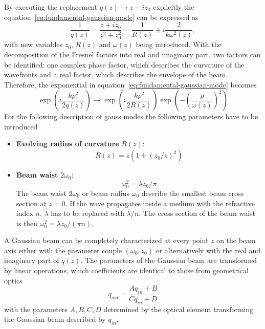 By executing the replacement $q(z)\rightarrow z-iz_0$ explicitly the equation~\eqref{eq:fundamental-gaussian-mode} can be expressed as 
\begin{equation}
\frac{1}{q(z)}=\frac{z+iz_0}{z^2+z_0^2}=\frac{1}{R(z)}+i\frac{2}{k\omega^2(z)},
\end{equation}
with new variables $z_0$, $R(z)$ and $\omega(z)$ being introduced.
With the decomposition of the Fresnel factors into real and imaginary part, two factors can be identified: one complex phase factor, which describes the curvature of the wavefronts and a real factor, which describes the envelope of the beam.
Therefore, the exponential in equation~\eqref{eq:fundamental-gaussian-mode} becomes
\begin{equation}
\exp\left(i\frac{k\rho^2}{2q(z)}\right) \rightarrow \exp\left(i\frac{k\rho^2}{2R(z)}\right)\exp\left(-\left(\frac{\rho}{\omega(z)}\right)^2\right)
\end{equation}
For the following description of gauss modes the following  parameters have to be introduced
\begin{itemize}
	\item \textbf{Evolving radius of curvature} $R(z)$:
	\begin{equation}
	\label{eq:radius-wavefronts}
	R(z)=z(1+(z_0/z)^2)
	\end{equation}
	\item \textbf{Beam waist} $2\omega_0$:
	\begin{equation}
	\label{eq:beam-waist}
	\omega_0^2=\lambda z_0/\pi
	\end{equation}
	The beam waist $2\omega_0$ or beam radius $\omega_0$ describe the smallest  beam cross section at $z=0$.
	If the wave propagates inside a medium with the refractive index $n$, $\lambda$ has to be replaced with $\lambda/n$.
	The cross section of the beam waist  is then $\omega_0^2=\lambda z_0/(\pi n)$.
\end{itemize}
A Gaussian beam can be completely characterized at every point $z$ on the beam axis either with the parameter couple $(\omega_0, z_0)$ or alternatively with the real and imaginary part of $q(z)$.
The parameters of the Gaussian beam are transformed by linear operations, which coefficients are identical to those from geometrical optics
\begin{equation}
\label{eq:ABCD-rule}
q_{out}=\frac{A q_{in} + B}{C q_{in} + D}
\end{equation}
with the parameters $A, B, C, D$ determined by the optical element transforming the Gaussian beam described by $q_{in}$.


